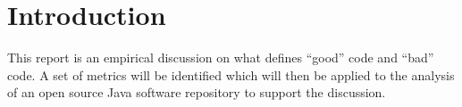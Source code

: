 \section{Introduction}

This report is an empirical discussion on what defines  ``good'' code and ``bad'' code. A set of metrics will be identified which will then be applied to the analysis of an open source Java software repository to support the discussion.